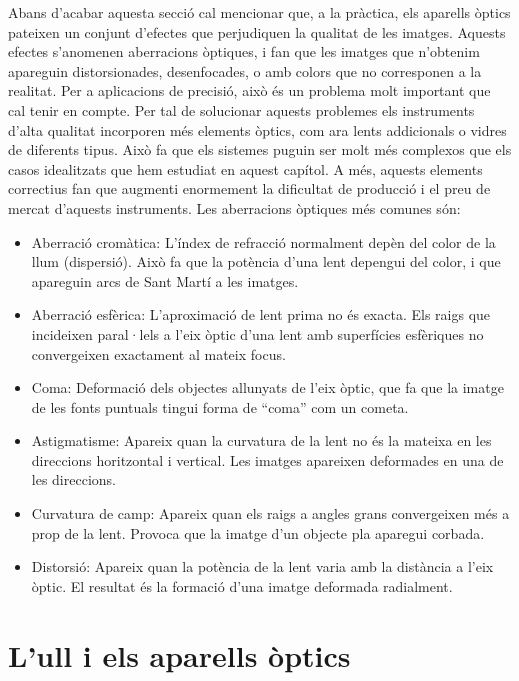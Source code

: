 \documentclass[12pt]{book}
\begin{document}
Abans d'acabar aquesta secció cal mencionar que, a la pràctica, els aparells òptics pateixen un conjunt d'efectes que perjudiquen la qualitat de les imatges. Aquests efectes s'anomenen aberracions òptiques, i fan que les imatges que n'obtenim apareguin distorsionades, desenfocades, o amb colors que no corresponen a la realitat. Per a aplicacions de precisió, això és un problema molt important que cal tenir en compte. Per tal de solucionar aquests problemes els instruments d'alta qualitat incorporen més elements òptics, com ara lents addicionals o vidres de diferents tipus. Això fa que els sistemes puguin ser molt més complexos que els casos idealitzats que hem estudiat en aquest capítol. A més, aquests elements correctius fan que augmenti enormement la dificultat de producció i el preu de mercat d'aquests instruments. Les aberracions òptiques més comunes són:

\begin{itemize}
    \item Aberració cromàtica: L'índex de refracció normalment depèn del color de la llum (dispersió). Això fa que la potència d'una lent depengui del color, i que apareguin arcs de Sant Martí a les imatges. 
    \item Aberració esfèrica: L'aproximació de lent prima no és exacta. Els raigs que incideixen paral·lels a l'eix òptic d'una lent amb superfícies esfèriques no convergeixen exactament al mateix focus. 
    \item Coma: Deformació dels objectes allunyats de l'eix òptic, que fa que la imatge de les fonts puntuals tingui forma de ``coma'' com un cometa. 
    \item Astigmatisme: Apareix quan la curvatura de la lent no és la mateixa en les direccions horitzontal i vertical. Les imatges apareixen deformades en una de les direccions.
    \item Curvatura de camp: Apareix quan els raigs a angles grans convergeixen més a prop de la lent. Provoca que la imatge d'un objecte pla aparegui corbada. 
    \item Distorsió: Apareix quan la potència de la lent varia amb la distància a l'eix òptic. El resultat és la formació d'una imatge deformada radialment.
\end{itemize}


\section{L'ull i els aparells òptics}
\end{document}

